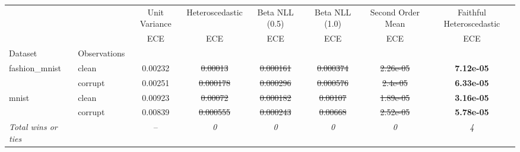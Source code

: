 \begin{tabular}{ll|c|c|c|c|c|c}
\toprule
{} & {} & {Unit Variance} & {Heteroscedastic} & {Beta NLL (0.5)} & {Beta NLL (1.0)} & {Second Order Mean} & {Faithful Heteroscedastic} \\
{} & {} & {ECE} & {ECE} & {ECE} & {ECE} & {ECE} & {ECE} \\
{Dataset} & {Observations} & {} & {} & {} & {} & {} & {} \\
\midrule
\multirow[t]{2}{*}{fashion_mnist} & clean & 0.00232 & \sout{0.00013} & \sout{0.000161} & \sout{0.000374} & \sout{2.26e-05} & \textbf{7.12e-05} \\
 & corrupt & 0.00251 & \sout{0.000178} & \sout{0.000296} & \sout{0.000576} & \sout{2.4e-05} & \textbf{6.33e-05} \\
\multirow[t]{2}{*}{mnist} & clean & 0.00923 & \sout{0.00072} & \sout{0.000182} & \sout{0.00107} & \sout{1.89e-05} & \textbf{3.16e-05} \\
 & corrupt & 0.00839 & \sout{0.000555} & \sout{0.000243} & \sout{0.00668} & \sout{2.52e-05} & \textbf{5.78e-05} \\
\textit{{Total wins or ties}} &  & -- & \textit{0} & \textit{0} & \textit{0} & \textit{0} & \textit{4} \\
\bottomrule
\end{tabular}
